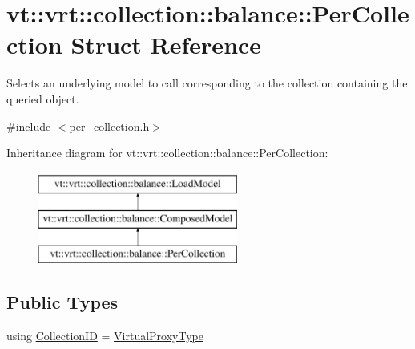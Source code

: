 \hypertarget{structvt_1_1vrt_1_1collection_1_1balance_1_1_per_collection}{}\section{vt\+:\+:vrt\+:\+:collection\+:\+:balance\+:\+:Per\+Collection Struct Reference}
\label{structvt_1_1vrt_1_1collection_1_1balance_1_1_per_collection}


Selects an underlying model to call corresponding to the collection containing the queried object.  




{\ttfamily \#include $<$per\+\_\+collection.\+h$>$}

Inheritance diagram for vt\+:\+:vrt\+:\+:collection\+:\+:balance\+:\+:Per\+Collection\+:\begin{figure}[H]
\begin{center}
\leavevmode
\includegraphics[height=3.000000cm]{structvt_1_1vrt_1_1collection_1_1balance_1_1_per_collection}
\end{center}
\end{figure}
\subsection*{Public Types}
\begin{DoxyCompactItemize}
\item 
using \hyperlink{structvt_1_1vrt_1_1collection_1_1balance_1_1_per_collection_ade08a6857f727a0a9d1ef63b25fc5b71}{Collection\+ID} = \hyperlink{namespacevt_a1b417dd5d684f045bb58a0ede70045ac}{Virtual\+Proxy\+Type}
\end{DoxyCompactItemize}
